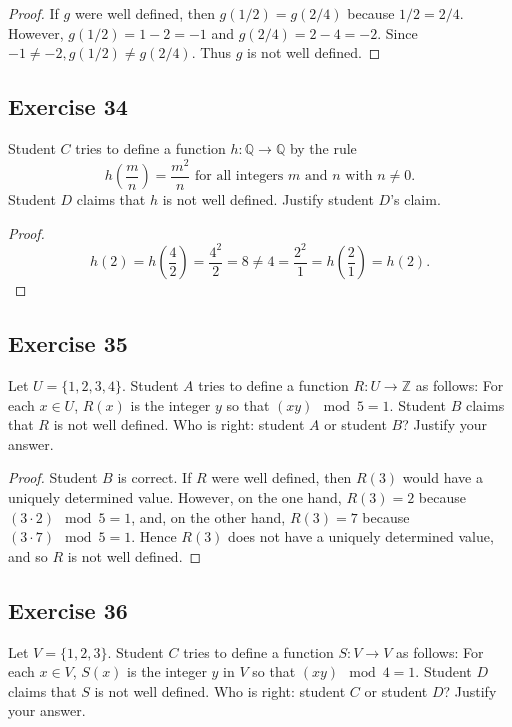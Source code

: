 \documentclass[14pt]{extarticle}
\newcommand{\Q}{\mathbb{Q}}
\newcommand{\Z}{\mathbb{Z}}
\begin{document}
\begin{proof}
    If $g$ were well defined, then \(g(1/2) = g(2/4)\) because \(1/2 = 2/4\). However, \(g(1/2) = 1 - 2 = -1\) and
    \(g(2/4) = 2 - 4 = -2\). Since \(-1 \neq -2, g(1/2) \neq g(2/4)\). Thus $g$ is not well defined.
\end{proof}

\subsection{Exercise 34}
Student $C$ tries to define a function \(h: \Q \to \Q\) by
the rule
\[
    h \left(\frac{m}{n}\right) = \frac{m^2}{n} \text{ for all integers } m \text{ and } n \text{ with } n \neq 0.
\]
Student $D$ claims that $h$ is not well defined. Justify student $D$'s claim.

\begin{proof}
    \[
        h(2) = h\left(\frac{4}{2}\right) = \frac{4^2}{2} = 8 \neq 4 = \frac{2^2}{1} = h\left(\frac{2}{1}\right) = h(2).
    \]
\end{proof}

\subsection{Exercise 35}
Let \(U = \{1, 2, 3, 4\}\). Student $A$ tries to define a function \(R: U \to \Z\) as follows: For each \(x \in U\),
\(R(x)\) is the integer $y$ so that \((xy) \mod 5 = 1\). Student $B$ claims that $R$ is not well defined. Who is
right: student $A$ or student $B$? Justify your answer.

\begin{proof}
    Student $B$ is correct. If $R$ were well defined, then $R(3)$ would have a uniquely determined value. However, on
    the one hand, \(R(3) = 2\) because \((3 \cdot 2) \mod 5 = 1\), and, on the other hand, \(R(3) = 7\) because
    \((3 \cdot 7) \mod 5 = 1\). Hence \(R(3)\) does not have a uniquely determined value, and so $R$ is not well defined.
\end{proof}

\subsection{Exercise 36}
Let \(V = \{1, 2, 3\}\). Student $C$ tries to define a function \(S: V \to V\) as follows: For each \(x \in V\),
\(S(x)\) is the integer $y$ in $V$ so that \((xy) \mod 4 = 1\). Student $D$ claims that $S$ is not well defined. Who
is right: student $C$ or student $D$? Justify your answer.
\end{document}
